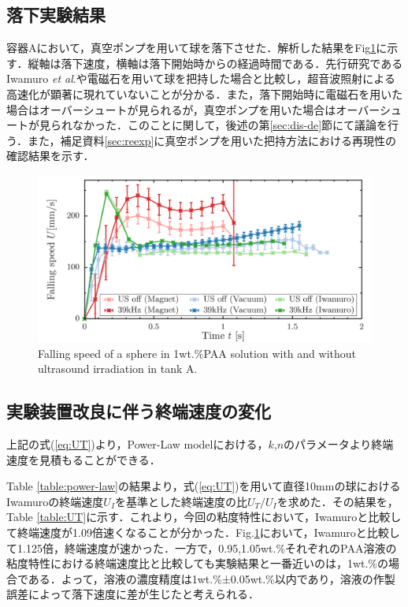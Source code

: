 \subsection{落下実験結果}

容器Aにおいて，真空ポンプを用いて球を落下させた．解析した結果をFig\ref{fig:falling-A}に示す．縦軸は落下速度，横軸は落下開始時からの経過時間である．先行研究であるIwamuro \textit{et al}.\cite{ref:8}や電磁石を用いて球を把持した場合と比較し，超音波照射による高速化が顕著に現れていないことが分かる．また，落下開始時に電磁石を用いた場合はオーバーシュートが見られるが，真空ポンプを用いた場合はオーバーシュートが見られなかった．このことに関して，後述の第\ref{sec:dis-de}節にて議論を行う．また，補足資料\ref{sec:reexp}に真空ポンプを用いた把持方法における再現性の確認結果を示す．

\begin{figure}[ht]
    \centering
    \includegraphics[width=12cm,clip]{./5-Results/s1-A.png}
    \caption{Falling speed of a sphere in 1wt.\%PAA solution with and without ultrasound irradiation in tank A.}
    \label{fig:falling-A}
\end{figure}

\subsection{実験装置改良に伴う終端速度の変化}

上記の式(\ref{eq:UT})より，Power-Law modelにおける，$k$,$n$のパラメータより終端速度を見積もることができる．

Table \ref{table:power-law}の結果より，式(\ref{eq:UT})を用いて直径10mmの球におけるIwamuro\cite{ref:8}の終端速度$U_I$を基準とした終端速度の比$U_T/U_{I}$を求めた．その結果を，Table \ref{table:UT}に示す．これより，今回の粘度特性において，Iwamuro\cite{ref:8}と比較して終端速度が1.09倍速くなることが分かった．Fig.\ref{fig:falling-A}において，Iwamuro\cite{ref:8}と比較して1.125倍，終端速度が速かった．一方で，0.95,1.05wt.\%それぞれのPAA溶液の粘度特性における終端速度比と比較しても実験結果と一番近いのは，1wt.\%の場合である．よって，溶液の濃度精度は1wt.\%±0.05wt.\%以内であり，溶液の作製誤差によって落下速度に差が生じたと考えられる．

